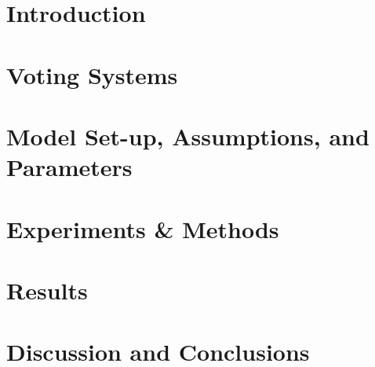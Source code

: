 \section{Introduction}
\label{sec:intro}
    


\section{Voting Systems}
\label{sec:voting_systems}
    


\section{Model Set-up, Assumptions, and Parameters}
\label{sec:model}
    


\section{Experiments \& Methods}
\label{sec:experiments}
    


\section{Results}
\label{sec:results}
    

\section{Discussion and Conclusions}
\label{sec:conclusion}
    
